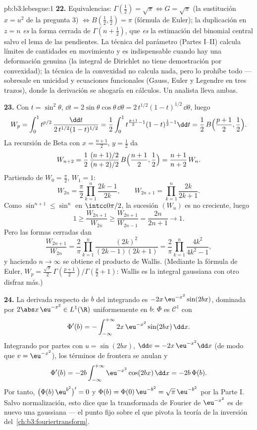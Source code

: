 \begin{solution}{pb:b3:lebesgue:1}
\textbf{22.} Equivalencias: $\Gamma(\frac12) = \sqrt\pi
\Leftrightarrow G = \sqrt\pi$ (la sustitución $x = u^2$ de la pregunta
3) $\Leftrightarrow B(\frac12, \frac12) = \pi$ (fórmula de Euler); la
duplicación en $z = n$ \emph{es} la forma cerrada de
$\Gamma(n + \frac12)$, que \emph{es} la estimación del binomial central
salvo el lema de las pendientes. La técnica del parámetro (Partes I--II)
calcula límites de cantidades en movimiento y es indispensable cuando
hay una deformación genuina (la integral de Dirichlet no tiene
demostración por convexidad); la técnica de la convexidad no calcula
nada, pero lo prohíbe todo --- sobresale en unicidad y ecuaciones
funcionales (Gauss, Euler y Legendre en tres trazos), donde la
derivación se ahogaría en cálculos. Un analista
 lleva ambas.

\textbf{23.} Con $t = \sin^2\theta$, $\dd t =
2\sin\theta\cos\theta\,\dd\theta =
2\,t^{1/2}(1-t)^{1/2}\,\dd\theta$, luego
\[
W_p = \int_0^1 t^{p/2}\,
\frac{\dd t}{2\,t^{1/2}(1-t)^{1/2}}
= \frac12\int_0^1 t^{\frac{p+1}2 - 1}(1-t)^{\frac12 - 1}\dd t
= \frac12\,B\Bigl(\frac{p+1}2, \frac12\Bigr).
\]
La recursión de Beta con $x = \frac{n+1}2$, $y = \frac12$ da
\[
W_{n+2} = \frac12\,
\frac{(n+1)/2}{(n+2)/2}\,B\Bigl(\frac{n+1}2, \frac12\Bigr)
= \frac{n+1}{n+2}\,W_n .
\]
Partiendo de $W_0 = \frac\pi2$, $W_1 = 1$:
\[
W_{2n} = \frac\pi2\prod_{k=1}^n\frac{2k-1}{2k},
\qquad
W_{2n+1} = \prod_{k=1}^n\frac{2k}{2k+1} .
\]
Como $\sin^{n+1} \leq \sin^n$ en $\intcc0{\pi/2}$, la sucesión $(W_n)$
es no creciente, luego
\[
1 \geq \frac{W_{2n+1}}{W_{2n}} \geq
\frac{W_{2n+1}}{W_{2n-1}} = \frac{2n}{2n+1}
\longrightarrow 1 .
\]
Pero las formas cerradas dan
\[
\frac{W_{2n+1}}{W_{2n}} = \frac2\pi
\prod_{k=1}^n\frac{(2k)^2}{(2k-1)(2k+1)}
= \frac2\pi\prod_{k=1}^n\frac{4k^2}{4k^2-1},
\]
y haciendo $n \to \infty$ se obtiene el producto de Wallis. (Mediante la
fórmula de Euler, $W_p = \frac{\sqrt\pi}2\,
\Gamma(\frac{p+1}2)/\Gamma(\frac p2 + 1)$: Wallis es la integral
gaussiana con otro disfraz más.)

\textbf{24.} La derivada respecto de $b$ del integrando es
$-2x\,\eu^{-x^2}\sin(2bx)$, dominada por $2\abs
x\,\eu^{-x^2} \in L^1(\R)$ uniformemente en $b$: $\Phi$ es
$\mathcal C^1$ con
\[
\Phi'(b) = -\int_{-\infty}^{+\infty}
2x\,\eu^{-x^2}\sin(2bx)\,\dd x .
\]
Integrando por partes con $u = \sin(2bx)$, $\dd v =
-2x\,\eu^{-x^2}\dd x$ (de modo que $v = \eu^{-x^2}$), los términos de
frontera se anulan y
\[
\Phi'(b) = -2b\int_{-\infty}^{+\infty}
\eu^{-x^2}\cos(2bx)\,\dd x = -2b\,\Phi(b).
\]
Por tanto, $\bigl(\Phi(b)\,\eu^{b^2}\bigr)' = 0$ y $\Phi(b) =
\Phi(0)\,\eu^{-b^2} = \sqrt\pi\,\eu^{-b^2}$ por la Parte I. Salvo
normalización, esto dice que la transformada de Fourier de $\eu^{-x^2}$
es de nuevo una gaussiana --- el punto fijo sobre el que pivota la
teoría de la inversión del~\cref{ch:b3:fouriertransform}.


\end{solution}
